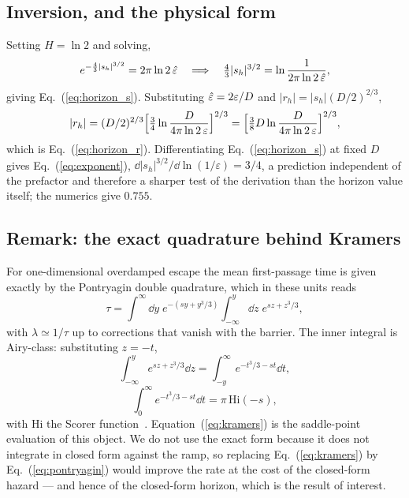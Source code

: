 \subsection{Inversion, and the physical form}

Setting $H=\ln2$ and solving,
\begin{equation}
e^{-\frac43|s_h|^{3/2}}=2\pi\ln2\,\hat\varepsilon
\quad\Longrightarrow\quad
\tfrac43|s_h|^{3/2}=\ln\frac{1}{2\pi\ln2\,\hat\varepsilon},
\end{equation}
giving Eq.~(\ref{eq:horizon_s}).  Substituting $\hat\varepsilon=2\varepsilon/D$ and $|r_h|=|s_h|(D/2)^{2/3}$,
\begin{equation}
|r_h|=(D/2)^{2/3}\Bigl[\tfrac34\ln\frac{D}{4\pi\ln2\,\varepsilon}\Bigr]^{2/3}
=\Bigl[\tfrac38D\ln\frac{D}{4\pi\ln2\,\varepsilon}\Bigr]^{2/3},
\end{equation}
which is Eq.~(\ref{eq:horizon_r}).  Differentiating Eq.~(\ref{eq:horizon_s}) at fixed $D$ gives Eq.~(\ref{eq:exponent}), $\dd|s_h|^{3/2}/\dd\ln(1/\varepsilon)=3/4$, a prediction independent of the prefactor and therefore a sharper test of the derivation than the horizon value itself; the numerics give $0.755$.

\subsection{Remark: the exact quadrature behind Kramers}

For one-dimensional overdamped escape the mean first-passage time is given exactly by the Pontryagin double quadrature, which in these units reads
\begin{equation}
\label{eq:pontryagin}
\tau=\int^{\infty}\!\!\dd y\;e^{-(sy+y^3/3)}\int_{-\infty}^{y}\!\!\dd z\;e^{sz+z^3/3},
\end{equation}
with $\lambda\simeq1/\tau$ up to corrections that vanish with the barrier.  The inner integral is Airy-class: substituting $z=-t$,
\begin{equation}
\int_{-\infty}^{y}e^{sz+z^3/3}\dd z=\int_{-y}^{\infty}e^{-t^3/3-st}\dd t,
\end{equation}
\begin{equation}
\int_{0}^{\infty}e^{-t^3/3-st}\dd t=\pi\,\mathrm{Hi}(-s),
\end{equation}
with $\mathrm{Hi}$ the Scorer function~\cite[\S9.12]{DLMF}.  Equation~(\ref{eq:kramers}) is the saddle-point evaluation of this object.  We do not use the exact form because it does not integrate in closed form against the ramp, so replacing Eq.~(\ref{eq:kramers}) by Eq.~(\ref{eq:pontryagin}) would improve the rate at the cost of the closed-form hazard --- and hence of the closed-form horizon, which is the result of interest.

